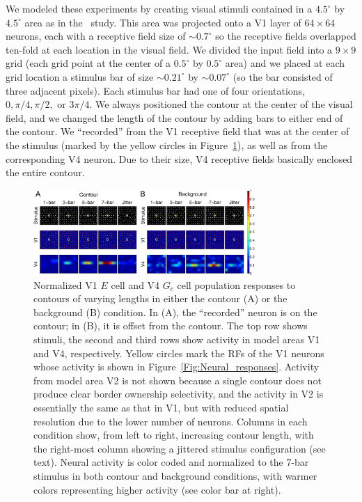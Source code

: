 We modeled these experiments by creating visual stimuli contained in a $4.5^{\circ}$ by $4.5^{\circ}$ area as in the~\cite{Chen_etal14} study. This area was projected onto a V1 layer of $64 \times 64$ neurons, each with a receptive field size of $\sim0.7^{\circ}$ so the receptive fields overlapped ten-fold at each location in the visual field. We divided the input field into a $9 \times 9$ grid (each grid point at the center of a $0.5^{\circ}$ by $0.5^{\circ}$ area) and we placed at each grid location a stimulus bar of size $\sim0.21^{\circ}$ by $\sim0.07^{\circ}$ (so the bar consisted of three adjacent pixels). Each stimulus bar had one of four orientations, $0, \pi/4, \pi/2,$ or $3\pi/4$. We always positioned the contour at the center of the visual field, and we changed the length of the contour by adding bars to either end of the contour. We ``recorded'' from the V1 receptive field that was at the center of the stimulus (marked by the yellow circles in Figure~\ref{Fig:Contour_Results}), as well as from the corresponding V4 neuron. Due to their size, V4 receptive fields basically enclosed the entire contour.

\begin{figure}[htbp]
\centering
\includegraphics[width=0.75\textwidth]{Contour/figs/Fig3.eps}
\makeatletter
\let\@currsize\normalsize
\caption{Normalized V1 $E$ cell and V4 $G_c$ cell population responses to contours of varying lengths in either the contour (A) or the background (B) condition. In (A), the ``recorded'' neuron is on the contour; in (B), it is offset from the contour. The top row shows stimuli, the second and third rows show activity in model areas V1 and V4, respectively. Yellow circles mark the RFs of the V1 neurons whose activity is shown in Figure~\ref{Fig:Neural_responses}. Activity from model area V2 is not shown because a single contour does not produce clear border ownership selectivity, and the activity in V2 is essentially the same as that in V1, but with reduced spatial resolution due to the lower number of neurons. Columns in each condition show, from left to right, increasing contour length, with the right-most column showing a jittered stimulus configuration (see text). Neural activity is color coded and normalized to the 7-bar stimulus in both contour and background conditions, with warmer colors representing higher activity (see color bar at right).}
\label{Fig:Contour_Results}
\end{figure}

